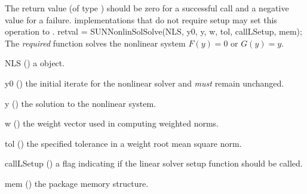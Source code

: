 {
  The return value  (of type ) should be zero for a
  successful call and a negative value for a failure.
}
{
  {\sunnonlinsol} implementations that do not require setup may set
  this operation to .
}
{
  retval = SUNNonlinSolSolve(NLS, y0, y, w, tol, callLSetup, mem);
}
{
  The \textit{required} function  solves the
  nonlinear system $F(y)=0$ or $G(y)=y$.
}
{
  \begin{args}[callLSetup]
  \item[NLS] ()
    a {\sunnonlinsol} object.
  \item[y0] ()
    the initial iterate for the nonlinear solver and \textit{must}
    remain unchanged.
  \item[y] ()
    the solution to the nonlinear system.
  \item[w] ()
    the weight vector used in computing weighted norms.
  \item[tol] ()
    the specified tolerance in a weight root mean square norm.
  \item[callLSetup] ()
    a flag indicating if the linear solver setup function should be
    called. 
  \item[mem] ()
    the {\sundials} package memory structure.
  \end{args}
}
